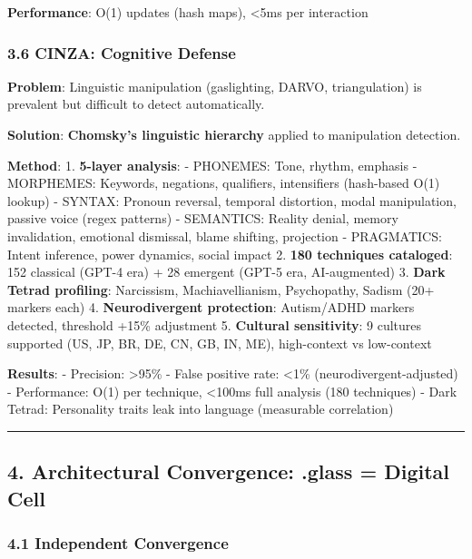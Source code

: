 \documentclass[
]{article}
\begin{document}
\textbf{Performance}: O(1) updates (hash maps), \textless5ms per
interaction

\subsubsection{3.6 CINZA: Cognitive
Defense}\label{cinza-cognitive-defense}

\textbf{Problem}: Linguistic manipulation (gaslighting, DARVO,
triangulation) is prevalent but difficult to detect automatically.

\textbf{Solution}: \textbf{Chomsky's linguistic hierarchy} applied to
manipulation detection.

\textbf{Method}: 1. \textbf{5-layer analysis}: - PHONEMES: Tone, rhythm,
emphasis - MORPHEMES: Keywords, negations, qualifiers, intensifiers
(hash-based O(1) lookup) - SYNTAX: Pronoun reversal, temporal
distortion, modal manipulation, passive voice (regex patterns) -
SEMANTICS: Reality denial, memory invalidation, emotional dismissal,
blame shifting, projection - PRAGMATICS: Intent inference, power
dynamics, social impact 2. \textbf{180 techniques cataloged}: 152
classical (GPT-4 era) + 28 emergent (GPT-5 era, AI-augmented) 3.
\textbf{Dark Tetrad profiling}: Narcissism, Machiavellianism,
Psychopathy, Sadism (20+ markers each) 4. \textbf{Neurodivergent
protection}: Autism/ADHD markers detected, threshold +15\% adjustment 5.
\textbf{Cultural sensitivity}: 9 cultures supported (US, JP, BR, DE, CN,
GB, IN, ME), high-context vs low-context

\textbf{Results}: - Precision: \textgreater95\% - False positive rate:
\textless1\% (neurodivergent-adjusted) - Performance: O(1) per
technique, \textless100ms full analysis (180 techniques) - Dark Tetrad:
Personality traits leak into language (measurable correlation)

\begin{center}\rule{0.5\linewidth}{0.5pt}\end{center}

\subsection{4. Architectural Convergence: .glass = Digital
Cell}\label{architectural-convergence-.glass-digital-cell}

\subsubsection{4.1 Independent
Convergence}\label{independent-convergence}
\end{document}
